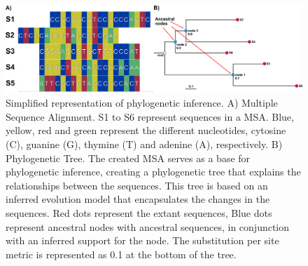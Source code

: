 \documentclass[unnumsec,webpdf,contemporary,large]{oup-authoring-template}%
\theoremstyle{thmstyleone}%
\theoremstyle{thmstyletwo}%
\theoremstyle{thmstylethree}%
\begin{document}
\begin{figure}[!t]
    \centering
    \includegraphics[width=\textwidth]{figs/fig1_phylo_tree.png}
    \caption{Simplified representation of phylogenetic inference. A) Multiple Sequence Alignment. S1 to S6 represent sequences in a MSA. Blue, yellow, red and green represent the different nucleotides, cytosine (C), guanine (G), thymine (T) and adenine (A), respectively. B) Phylogenetic Tree. The created MSA serves as a base for phylogenetic inference, creating a phylogenetic tree that explains the relationships between the sequences. This tree is based on an inferred evolution model that encapsulates the changes in the sequences. Red dots represent the extant sequences, Blue dots represent ancestral nodes with ancestral sequences, in conjunction with an inferred support for the node. The substitution per site metric is represented as 0.1 at the bottom of the tree.}
    \label{fig:image1}
\end{figure}
\end{document}
